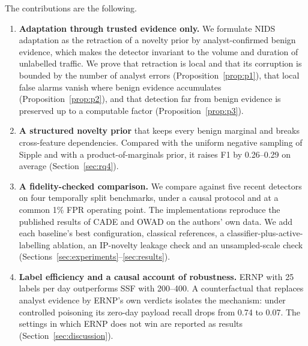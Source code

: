 \documentclass[a4paper,fleqn]{cas-dc}
\newcommand{\ERNP}{ERNP\xspace}
\begin{document}
The contributions are the following.
\begin{enumerate}
  \item \textbf{Adaptation through trusted evidence only.} We formulate NIDS adaptation as the retraction of a novelty prior by analyst-confirmed benign evidence, which makes the detector invariant to the volume and duration of unlabelled traffic. We prove that retraction is local and that its corruption is bounded by the number of analyst errors (Proposition~\ref{prop:p1}), that local false alarms vanish where benign evidence accumulates (Proposition~\ref{prop:p2}), and that detection far from benign evidence is preserved up to a computable factor (Proposition~\ref{prop:p3}).
  \item \textbf{A structured novelty prior} that keeps every benign marginal and breaks cross-feature dependencies. Compared with the uniform negative sampling of Sipple \cite{sipple2020negative} and with a product-of-marginals prior, it raises F1 by 0.26--0.29 on average (Section~\ref{sec:rq4}).
  \item \textbf{A fidelity-checked comparison.} We compare against five recent detectors on four temporally split benchmarks, under a causal protocol and at a common 1\% FPR operating point. The implementations reproduce the published results of CADE and OWAD on the authors' own data. We add each baseline's best configuration, classical references, a classifier-plus-active-labelling ablation, an IP-novelty leakage check and an unsampled-scale check (Sections~\ref{sec:experiments}--\ref{sec:results}).
  \item \textbf{Label efficiency and a causal account of robustness.} \ERNP with 25 labels per day outperforms SSF with 200--400. A counterfactual that replaces analyst evidence by \ERNP's own verdicts isolates the mechanism: under controlled poisoning its zero-day payload recall drops from 0.74 to 0.07. The settings in which \ERNP does not win are reported as results (Section~\ref{sec:discussion}).
\end{enumerate}
\end{document}
